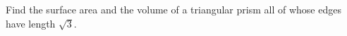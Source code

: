 Find the surface area and the volume of a triangular prism all of whose edges have length $\sqrt3$.
